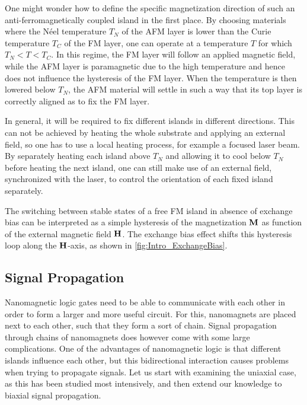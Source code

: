 \documentclass[11pt,a4paper,english]{article}
\begin{document}
One might wonder how to define the specific magnetization direction of such an anti-ferromagnetically coupled island in the first place. By choosing materials where the N\'{e}el temperature $T_N$ of the AFM layer is lower than the Curie temperature $T_C$ of the FM layer, one can operate at a temperature $T$ for which $T_N < T < T_C$. In this regime, the FM layer will follow an applied magnetic field, while the AFM layer is paramagnetic due to the high temperature and hence does not influence the hysteresis of the FM layer. When the temperature is then lowered below $T_N$, the AFM material will settle in such a way that its top layer is correctly aligned as to fix the FM layer.~\cite{ExchangeBias_Mechanisms} \par
In general, it will be required to fix different islands in different directions. This can not be achieved by heating the whole substrate and applying an external field, so one has to use a local heating process, for example a focused laser beam. By separately heating each island above $T_N$ and allowing it to cool below $T_N$ before heating the next island, one can still make use of an external field, synchronized with the laser, to control the orientation of each fixed island separately. \par
The switching between stable states of a free FM island in absence of exchange bias can be interpreted as a simple hysteresis of the magnetization $\vb{M}$ as function of the external magnetic field $\vb{H}$. The exchange bias effect shifts this hysteresis loop along the $\vb{H}$-axis, as shown in \cref{fig:Intro_ExchangeBias}. %

\subsection{Signal Propagation}
Nanomagnetic logic gates need to be able to communicate with each other in order to form a larger and more useful circuit. For this, nanomagnets are placed next to each other, such that they form a sort of chain. Signal propagation through chains of nanomagnets does however come with some large complications. One of the advantages of nanomagnetic logic is that different islands influence each other, but this bidirectional interaction causes problems when trying to propagate signals. Let us start with examining the uniaxial case, as this has been studied most intensively, and then extend our knowledge to biaxial signal propagation.
\end{document}
